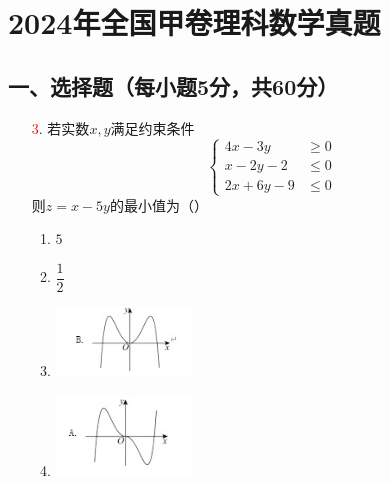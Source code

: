 \documentclass[12pt]{ctexart}
\begin{document}
\section*{2024年全国甲卷理科数学真题}

\subsection*{一、选择题（每小题5分，共60分）}

\begin{enumerate}[label=\arabic*.]
    \item[\textcolor{red}{3}.] 若实数\( x,y \)满足约束条件
    \[
    \left\{
    \begin{aligned}
        4x - 3y &\geq 0 \\
        x - 2y - 2 &\leq 0 \\
        2x + 6y - 9 &\leq 0
    \end{aligned}
    \right.
    \]
    则\( z = x - 5y \)的最小值为（）
    \begin{enumerate}[label=\Alph*.]
        \item \( 5 \)
        \item \( \dfrac{1}{2} \)
        \item \includegraphics[width=0.3\textwidth]{cropped_0.jpg}
        \item \includegraphics[width=0.3\textwidth]{cropped_1.jpg}
    \end{enumerate}
    

\end{enumerate}
\end{document}
